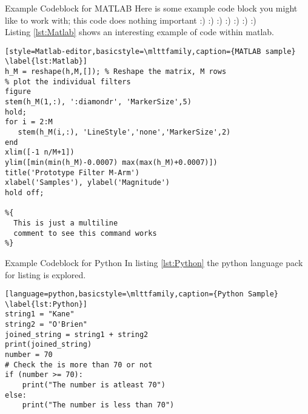 \begin{codeblock}{Example Codeblock for MATLAB}
Here is some example code block you might like to work with; this code does nothing important :) :) :) :) :) :) :)\\

Listing \ref{lst:Matlab} shows an interesting example of code within matlab.
\begin{lstlisting}[style=Matlab-editor,basicstyle=\mlttfamily,caption={MATLAB sample} \label{lst:Matlab}]
h_M = reshape(h,M,[]); % Reshape the matrix, M rows
% plot the individual filters
figure
stem(h_M(1,:), ':diamondr', 'MarkerSize',5)
hold;
for i = 2:M
   stem(h_M(i,:), 'LineStyle','none','MarkerSize',2)
end
xlim([-1 n/M+1])
ylim([min(min(h_M)-0.0007) max(max(h_M)+0.0007)])
title('Prototype Filter M-Arm')
xlabel('Samples'), ylabel('Magnitude')
hold off;

%{
  This is just a multiline
  comment to see this command works
%}
\end{lstlisting}
\end{codeblock}



\begin{codeblock}{Example Codeblock for Python}
In listing \ref{lst:Python} the python language pack for listing is explored.

\begin{lstlisting}[language=python,basicstyle=\mlttfamily,caption={Python Sample} \label{lst:Python}]
string1 = "Kane"
string2 = "O'Brien"
joined_string = string1 + string2
print(joined_string)
number = 70
# Check the is more than 70 or not
if (number >= 70):
    print("The number is atleast 70")
else:
    print("The number is less than 70")
\end{lstlisting}
\end{codeblock}
\clearpage
